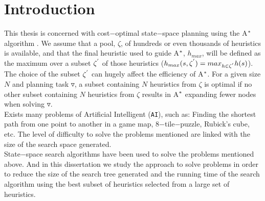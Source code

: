 \documentclass[
	12pt,				%
	openright,			%
	twoside,			%
	a4paper,			%
	english,			%
	french,				%
	spanish,			%
	brazil				%
	]{abntex2}
\begin{document}
\tableofcontents*
\cleardoublepage



\textual

\chapter*[Introduction]{Introduction}

\noindent
This thesis is concerned with cost$-$optimal state$-$space planning using the A$\sp{*}$ algorithm \cite{hart1968formal}. We assume that a pool, $\zeta$, of hundreds or even thousands of heuristics is available, and that the final heuristic used to guide A$\sp{*}$, $h_{max}$, will be defined as the maximum over a subset $\zeta\sp{'}$ of those heuristics ($h_{max}(s, \zeta\sp{'}) = max_{h\in\zeta\sp{'}}h(s)$). The choice of the subset $\zeta\sp{'}$ can hugely affect the efficiency of A$\sp{*}$. For a given size $N$ and planning task $\triangledown$, a subset containing $N$ heuristics from $\zeta$ is optimal if no other subset containing $N$ heuristics from $\zeta$ results in A$\sp{*}$ expanding fewer nodes when solving $\triangledown$. \\ 

Exists many problems of Artificial Intelligent (\texttt{AI}), such as: Finding the shortest path from one point to another in a game map, 8$-$tile$-$puzzle, Rubick's cube, etc. The level of difficulty to solve the problems mentioned are linked with the size of the search space generated. \\

State$-$space search algorithms have been used to solve the problems mentioned above. And in this dissertation we study the approach to solve problems in order to reduce the size of the search tree generated and the running time of the search algorithm using the best subset of heuristics selected from a large set of heuristics.

\end{document}
